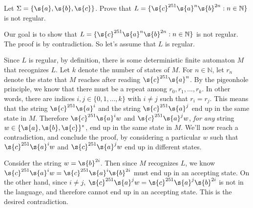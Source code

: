 \begin{flex}
\label{grp:grm:deterministic-finite-automata::regular}

\begin{gram}
\label{grm:deterministic-finite-automata::regular}
\begin{exercise} \label{exercise:c251anb2n-is-not-regular}
Let $\Sigma = \{\s{a},\s{b},\s{c}\}$. Prove that $L = \{\s{c}^{251} \s{a}^n \s{b}^{2n}: n \in \mathbb{N}\}$ is not regular. 
\end{exercise}
\begin{solution}
Our goal is to show that $L = \{\s{c}^{251} \s{a}^n \s{b}^{2n}: n \in \mathbb{N}\}$ is not regular. The proof is by contradiction. So let's assume that $L$ is regular. 

Since $L$ is regular, by definition, there is some deterministic finite automaton $M$ that recognizes $L$. Let $k$ denote the number of states of $M$. For $n \in \mathbb{N}$, let $r_n$ denote the state that $M$ reaches after reading $\s{c}^{251}\s{a}^n$. By the pigeonhole principle, we know that there must be a repeat among $r_0, r_1,\ldots, r_k$. In other words, there are indices $i, j \in \{0,1,\ldots,k\}$ with $i \neq j$ such that $r_i = r_j$. This means that the string $\s{c}^{251}\s{a}^i$ and the string $\s{c}^{251}\s{a}^j$ end up in the same state in $M$. Therefore $\s{c}^{251}\s{a}^iw$ and $\s{c}^{251}\s{a}^jw$, \emph{for any} string $w \in \{\s{a},\s{b},\s{c}\}^*$, end up in the same state in $M$. We'll now reach a contradiction, and conclude the proof, by considering a particular $w$ such that $\s{c}^{251}\s{a}^iw$ and $\s{c}^{251}\s{a}^jw$ end up in different states. 

Consider the string $w = \s{b}^{2i}$. Then since $M$ recognizes $L$, we know $\s{c}^{251}\s{a}^iw = \s{c}^{251}\s{a}^i\s{b}^{2i}$ must end up in an accepting state. On the other hand, since $i \neq j$, $\s{c}^{251}\s{a}^jw = \s{c}^{251}\s{a}^j\s{b}^{2i}$ is not in the language, and therefore cannot end up in an accepting state. This is the desired contradiction.
\end{solution}

\end{gram}
\end{flex}

